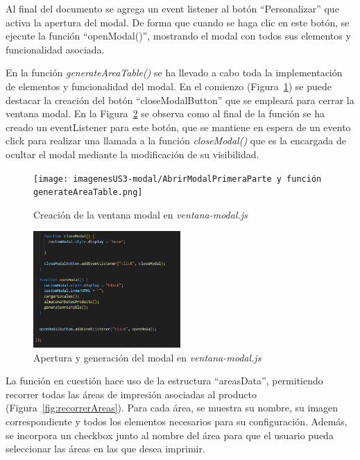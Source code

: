 \documentclass[11pt]{article}
\begin{document}
Al final del documento se agrega un event listener al botón ``Personalizar'' que activa la apertura del modal. De forma que cuando se haga clic en este botón, se 
ejecute la función ``openModal()'', mostrando el modal con todos sus elementos y funcionalidad asociada.

En la función \textit{generateAreaTable()} se ha llevado a cabo toda la implementación de elementos y funcionalidad del modal. En el comienzo (Figura~\ref{fig:iniciojs}) se puede destacar la creación del botón
``closeModalButton'' que se empleará para cerrar la ventana modal. En la Figura~\ref{fig:finaljs} se observa como al final de la función se ha creado un eventListener para este botón, que se mantiene en espera de un evento
click para realizar una llamada a la función \textit{closeModal()} que es la encargada de ocultar el modal mediante la modificación de su visibilidad.

\begin{figure}[H]
    \centering
    \texttt{[image: imagenesUS3-modal/AbrirModalPrimeraParte y función generateAreaTable.png]}
    \caption{\label{fig:iniciojs} Creación de la ventana modal en \textit{ventana-modal.js}}
    \vspace{\fill}
\end{figure}

\begin{figure}[H]
    \centering
    \includegraphics[width=0.5\textwidth]{imagenesUS3-modal/FinalDeOpenModal.png}
    \caption{\label{fig:finaljs} Apertura y generación del modal en \textit{ventana-modal.js}}
    \vspace{\fill}
\end{figure}

La función en cuestión hace uso de la estructura ``areasData'', permitiendo recorrer todas las áreas de impresión asociadas al producto (Figura~\ref{fig:recorrerAreas}). 
Para cada área, se muestra su nombre, su imagen correspondiente y todos los elementos necesarios para su configuración. Además, se incorpora
un checkbox junto al nombre del área para que el usuario pueda seleccionar las áreas en las que desea imprimir.
\end{document}
